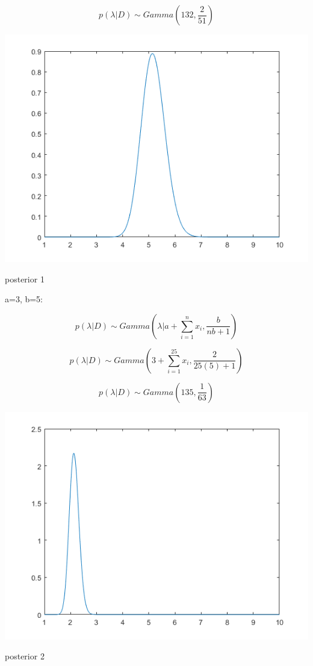 \documentclass[a4paper]{article}
\begin{document}
$$p(\lambda|D)\sim Gamma(132, \frac{2}{51})$$

\begin{center}
    \includegraphics[scale=1]{2d-1.png}
    \caption{posterior 1}
\end{center}




a=3, b=5:

$$p(\lambda|D)\sim Gamma(\lambda |a+\sum_{i=1}^{n}x_i, \frac{b}{nb+1})$$

$$p(\lambda|D)\sim Gamma(3+\sum_{i=1}^{25}x_i, \frac{2}{25(5)+1})$$

$$p(\lambda|D)\sim Gamma(135, \frac{1}{63})$$

\begin{center}
    \includegraphics[scale=1]{2d-2.png}
    \caption{posterior 2}
\end{center}
\end{document}
